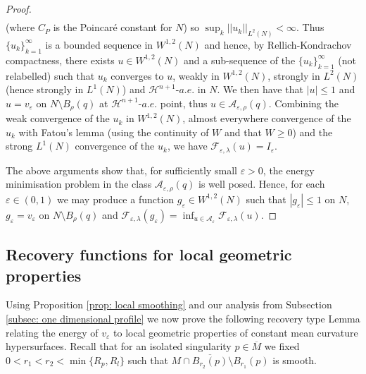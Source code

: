 \documentclass[11pt]{article}
\begin{document}
\begin{proof}
\begin{align*}
\end{align*}
(where $C_P$ is the Poincar\'e constant for $N$) so $\sup_k ||u_k||_{L^2(N)} < \infty$. 
Thus $\{ u_k \}_{k = 1}^\infty$ is a bounded sequence in $W^{1,2}(N)$ and hence, by Rellich-Kondrachov compactness, there exists $u \in W^{1,2}(N)$ and a sub-sequence of the $\{u_k\}_{k = 1}^\infty$ (not relabelled) such that $u_k$ converges to $u$, weakly in $W^{1,2}(N)$, strongly in $L^2(N)$ (hence strongly in $L^1(N)$) and $\mathcal{H}^{n+1}\text{-}a.e. \text{ in } N$. We then have that $|u| \leq 1$ and $u = v_\varepsilon$ on $N \setminus B_{\rho}(q)$ at $\mathcal{H}^{n+1}$-$a.e.$ point, thus $u \in \mathcal{A}_{\varepsilon,\rho}(q)$. Combining the weak convergence of the $u_k$ in $W^{1,2}(N)$, almost everywhere convergence of the $u_k$ with Fatou's lemma (using the continuity of $W$ and that $W \geq 0$) and the strong $L^1(N)$ convergence of the $u_k$, we have $\mathcal{F}_{\varepsilon,\lambda}(u) = I_\varepsilon$. 

\bigskip

The above arguments show that, for sufficiently small $\varepsilon > 0$, the energy minimisation problem in the class $\mathcal{A}_{\varepsilon,\rho}(q)$ is well posed. Hence, for each  $\varepsilon \in (0,1)$ we may produce a function $g_\varepsilon \in W^{1,2}(N)$ such that $|g_\varepsilon| \leq 1$ on $N$, $g_\varepsilon = v_\varepsilon$ on
$N \setminus B_{\rho}(q)$ and $\mathcal{F}_{\varepsilon,\lambda}(g_\varepsilon) = \inf_{u \in \mathcal{A_\varepsilon}}\mathcal{F}_{\varepsilon,\lambda} (u)$. \end{proof}

\subsection{Recovery functions for local geometric properties}\label{subsec: recovery functions}

Using Proposition \ref{prop: local smoothing} and our analysis from Subsection \ref{subsec: one dimensional profile} we now prove the following recovery type Lemma relating the energy of $v_\varepsilon$ to local geometric properties of constant mean curvature hypersurfaces. Recall that for an isolated singularity $p \in \overline{M}$ we fixed $0 < r_1 < r_2 < \min\{R_p,R_l\}$ such that $M \cap \overline{B_{r_2}(p)} \setminus B_{r_1}(p)$ is smooth.
\end{document}

